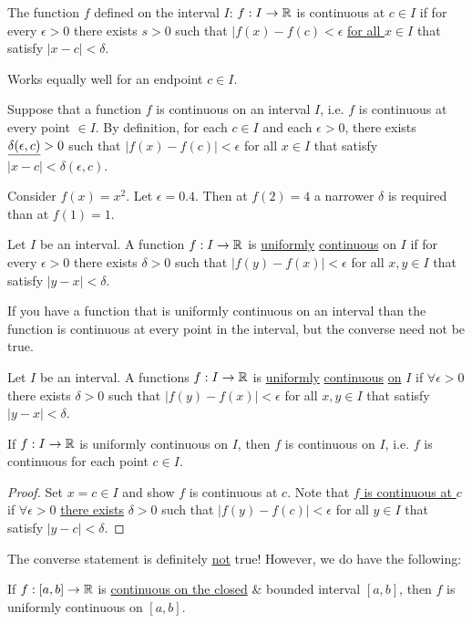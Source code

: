 \documentclass[]{article}
\begin{document}
\begin{definition}
	 The function $f$ defined on the interval $I$: $f:I\rightarrow\mathbb{R}$ is continuous at $c\in I$ if for every $\epsilon>0$ there exists $s>0$ such that $|f(x) - f(c)<\epsilon$ \ul{for all $x\in I$} that satisfy $|x-c|<\delta$.
\end{definition}
\begin{remark}
	Works equally well for an endpoint $c\in I$.
\end{remark}
Suppose that a function $f$ is continuous on an interval $I$, i.e. $f$ is continuous at every point $\in I$. By definition, for each \ul{$c\in I$} and each \ul{$\epsilon>0$}, there exists $\underline{\delta(\epsilon,c)}>0$ such that $|f(x)-f(c)|<\epsilon$ for all $x\in I$ that satisfy $|x-c|<\delta(\epsilon,c)$.
\begin{example}
	Consider $f(x) = x^2$. Let $\epsilon = 0.4$. Then at $f(2) = 4$ a narrower $\delta$ is required than at $f(1) = 1$.
\end{example}
\begin{definition}
	Let $I$ be an interval. A function $f: I\rightarrow\mathbb{R}$ is \ul{uniformly} \ul{continuous} on $I$ if for every $\epsilon>0$ there exists $\delta>0$ such that $|f(y)-f(x)|<\epsilon$ for all $x,y\in I$ that satisfy $|y-x|<\delta$.
\end{definition}
\begin{remark}
	If you have a function that is uniformly continuous on an interval than the function is continuous at every point in the interval, but the converse need not be true.
\end{remark}

\begin{definition}
	Let $I$ be an interval. A functions $f:I\rightarrow \mathbb{R}$ is \ul{uniformly} \ul{continuous} \ul{on} \ul{$I$} if $\forall \epsilon>0$ there exists \ul{$\delta>0$} such that \ul{$|f(y) - f(x)|<\epsilon$} for all $x,y\in I$ that satisfy \ul{$|y-x|<\delta$}.
\end{definition}
\begin{theorem}
	If $f:I\rightarrow \mathbb{R}$ is uniformly continuous on $I$, then $f$ is continuous on $I$, i.e. $f$ is continuous for each point $c\in I$.
\end{theorem}
\begin{proof}
	Set \ul{$x=c\in I$} and show $f$ is continuous at $c$. Note that \ul{$f$ is continuous at $c$} if \ul{$\forall \epsilon>0$} \ul{there exists} \ul{$\delta>0$} such that $|f(y)-f(c)|<\epsilon$ for all $y\in I$ that satisfy $|y-c|<\delta$.
\end{proof}
\begin{remark}
	The converse statement is definitely \ul{not} true!
	However, we do have the following:
\end{remark}
\begin{theorem}
	If $f:[a,b] \rightarrow \mathbb{R}$ is \ul{continuous on the closed} \& bounded interval $[a,b]$, then $f$ is uniformly continuous on $[a,b]$.
\end{theorem}
\end{document}
